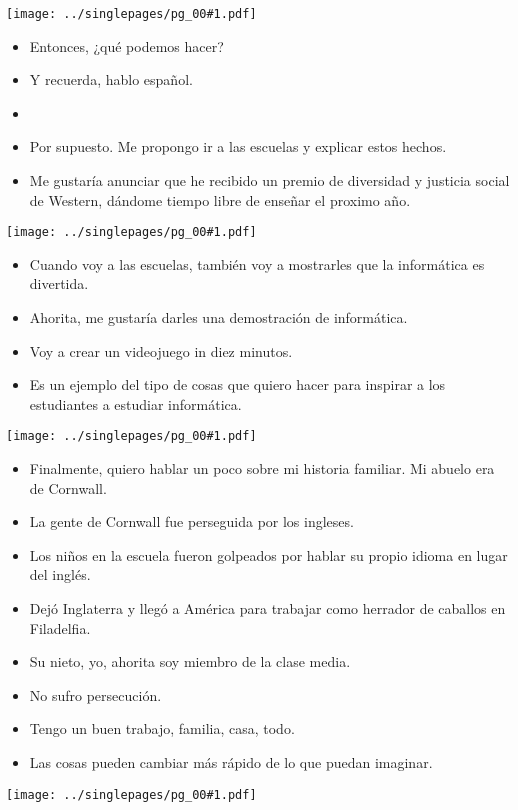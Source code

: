 \documentclass[12pt]{article}
\newcommand{\bi}{\begin{itemize}}
\newcommand{\ei}{\end{itemize}}
\newcommand{\cue}{\mbox{}
  \fbox{\sf Next slide}
}
\newcommand{\fig}[1]{
  \newpage  
  \begin{center}
    \texttt{[image: ../singlepages/pg\_00\#1.pdf]}
  \end{center}
  
}
\begin{document}
\fig{20}

\bi
\item
Entonces, ¿qué podemos hacer?
\item
Y recuerda, hablo español.
\item \cue
\item Por supuesto.  Me propongo ir a las escuelas y explicar estos hechos. 
\item
Me gustaría anunciar que he recibido un premio de diversidad y
justicia social de Western, dándome tiempo libre de enseñar el proximo
año. 
\ei

\fig{21}
\bi
\item Cuando voy a las escuelas, también voy a mostrarles que la
  informática es divertida.
\item
Ahorita, me gustaría darles una demostración de informática.
\item
Voy a crear un videojuego in diez minutos.
\item
Es un ejemplo del tipo de cosas que quiero hacer para inspirar a los
estudiantes a estudiar informática.
\ei

\fig{22}
\bi
\item
Finalmente, quiero hablar un poco sobre mi historia familiar.  Mi
abuelo era de Cornwall.
\item
  La gente de Cornwall fue perseguida por los
  ingleses.
\item Los niños en la escuela fueron golpeados por hablar su
  propio idioma en lugar del inglés.
\item
  Dejó Inglaterra y llegó a América
  para trabajar como herrador de caballos en Filadelfia.
\item
  Su nieto, yo,
  ahorita soy miembro de la clase media.
\item
  No sufro persecución.
\item Tengo
  un buen trabajo, familia, casa, todo.
\item
  Las cosas pueden cambiar más
rápido de lo que puedan imaginar.
\ei

\fig{23}
\end{document}
